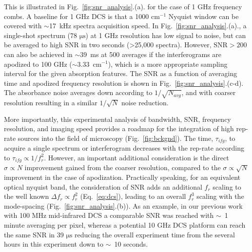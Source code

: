 \documentclass{optica-article}
\begin{document}
This is illustrated in \mbox{Fig. \ref{fig:snr_analysis}.(a).} for the case of 1 GHz frequency combs. A baseline for 1 GHz DCS is that a 1000 $\mathrm{cm^{-1}}$ Nyquist window can be covered with \mbox{$\sim$17 kHz} spectra acquisition speed. In \mbox{Fig. \ref{fig:snr_analysis}.(a).}, a single-shot spectrum (78 $\mathrm{\mu s}$) at 1 GHz resolution has low signal to noise, but can be averaged to high SNR in two seconds (>25,000 spectra). However, \mbox{$\mathrm{SNR>200}$} can also be achieved in \mbox{$\sim$39 ms} at 500 averages if the interferograms are apodized to 100 GHz (\mbox{$\sim$3.33 $\mathrm{cm^{-1}}$}), which is a more appropriate sampling interval for the given absorption features. The SNR as a function of averaging time and apodized frequency resolution is shown in \mbox{Fig. \ref{fig:snr_analysis}.(c-d)}. The absorbance noise averages down according to $1/\sqrt{N_{avg}}$, and with coarser resolution resulting in a similar $1/\sqrt{N}$ noise reduction. 

More importantly, this experimental analysis of bandwidth, SNR, frequency resolution, and imaging speed provides a roadmap for the integration of high rep-rate sources into the field of microscopy (\mbox{Fig. \ref{fig:bckgnd}}). The time, $\tau_{ifg}$, to acquire a single spectrum or interferogram decreases with the rep-rate according to $\tau_{ifg} \propto 1 / f_r^2$. However, an important additional consideration is the direct $\sigma \propto N$ improvement gained from the coarser resolution, compared to the $\sigma \propto \sqrt{N}$ improvement in the case of apodization. Practically speaking, for an equivalent optical nyquist band, the consideration of SNR adds an additional $f_r$ scaling to the well known $\Delta f_r \propto f_r^2$ (\mbox{Eq. \ref{eq:dcs}}), leading to an overall $f_r^3$ scaling with the mode-spacing (\mbox{Fig. \ref{fig:snr_analysis}.(b)}). As an example, in our previous work with 100 MHz mid-infrared DCS \cite{lindMidInfraredFrequencyComb2020,timmersMolecularFingerprintingBright2018} a comparable SNR was reached with \mbox{$\sim$ 1} minute averaging per pixel, whereas a potential 10 GHz DCS platform can reach the same SNR in 39 $\mathrm{\mu s}$ reducing the overall experiment time from the several hours in this experiment down to \mbox{$\sim$ 10} seconds.
\end{document}
